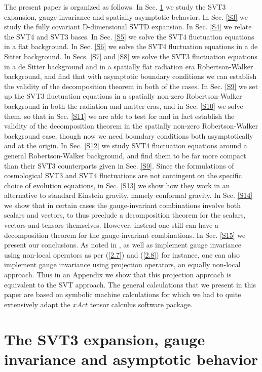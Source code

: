 \documentclass[aps,onecolumn,10pt]{revtex4}
\numberwithin{equation}{section}
\numberwithin{equation}{section}
\begin{document}
The present paper is organized as follows. In Sec. \ref{S2} we study the SVT3 expansion, gauge invariance and spatially asymptotic behavior. In Sec. \ref{S3} we study the fully covariant D-dimensional SVTD expansion. In Sec. \ref{S4} we relate the SVT4 and SVT3 bases. In Sec. \ref{S5} we solve the SVT4 fluctuation equations in a flat background. In Sec. \ref{S6} we solve the SVT4 fluctuation equations in a de Sitter background. In Secs. \ref{S7} and \ref{S8} we solve the SVT3 fluctuation equations in a de Sitter background and  in a spatially flat radiation era Robertson-Walker background, and find that with asymptotic boundary conditions we can establish the validity of the decomposition theorem in both of the cases. In Sec. \ref{S9} we set up  the SVT3 fluctuation equations in a spatially non-zero Robertson-Walker background in both the radiation and matter eras, and in Sec. \ref{S10} we solve them, so that in Sec. \ref{S11} we are  able to test for and in fact establish the validity of the decomposition theorem in the spatially non-zero Robertson-Walker background case, though now we need boundary conditions both asymptotically and at the origin. In Sec. \ref{S12} we study SVT4 fluctuation equations around a general Robertson-Walker background, and find them to be far more compact than their SVT3 counterparts given in Sec. \ref{S9}. Since the formulations of cosmological SVT3 and SVT4 fluctuations are not contingent on the specific choice of evolution equations, in Sec. \ref{S13} we show how they work in an alternative to standard Einstein gravity, namely conformal gravity.  In Sec. \ref{S14} we show that in certain cases the gauge-invariant combinations involve both scalars and vectors, to thus preclude a decomposition theorem for the scalars, vectors and tensors themselves. However, instead one still can have a decomposition theorem for the gauge-invariant combinations. In Sec. \ref{S15} we present our conclusions. As noted in \cite{Amarasinghe2018}, as well as implement gauge invariance using non-local operators as per (\ref{2.7}) and (\ref{2.8}) for instance, one can also implement gauge invariance using projection operators, an equally non-local approach.   Thus in an Appendix  we show that this projection approach is equivalent to the SVT approach. The general calculations that we present in this paper are based on symbolic machine calculations for which we  had to quite extensively adapt the $xAct$ tensor calculus software package.




\section{The SVT3 expansion, gauge invariance and asymptotic behavior}
\label{S2}
\end{document}

